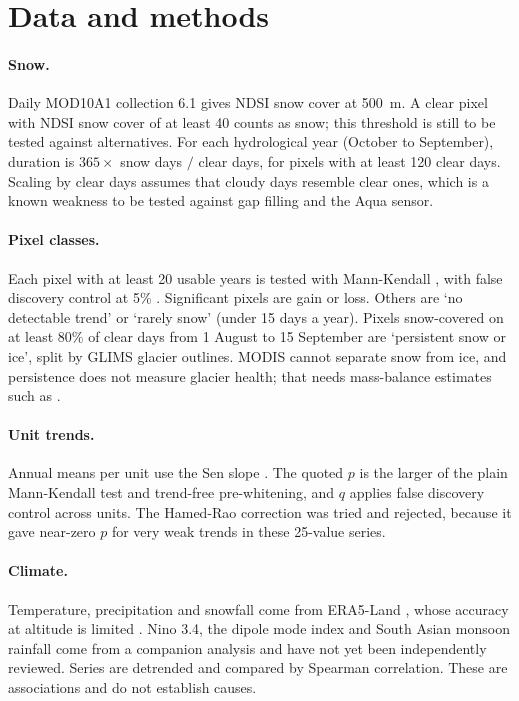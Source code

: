 \documentclass[11pt,a4paper]{article}
\begin{document}
\section{Data and methods}
\paragraph{Snow.} Daily MOD10A1 collection 6.1 \citep{Hall_2002,Riggs_2017} gives NDSI snow cover at 500~m. A clear pixel with NDSI snow cover of at least 40 counts as snow; this threshold is still to be tested against alternatives. For each hydrological year (October to September), duration is $365 \times$ snow days $/$ clear days, for pixels with at least 120 clear days. Scaling by clear days assumes that cloudy days resemble clear ones, which is a known weakness to be tested against gap filling and the Aqua sensor.

\paragraph{Pixel classes.} Each pixel with at least 20 usable years is tested with Mann-Kendall \citep{Yue_2002}, with false discovery control at 5\% \citep{Benjamini_1995,Wilks_2016}. Significant pixels are gain or loss. Others are `no detectable trend' or `rarely snow' (under 15 days a year). Pixels snow-covered on at least 80\% of clear days from 1 August to 15 September are `persistent snow or ice', split by GLIMS glacier outlines. MODIS cannot separate snow from ice, and persistence does not measure glacier health; that needs mass-balance estimates such as \citet{Hugonnet_2021}.

\paragraph{Unit trends.} Annual means per unit use the Sen slope \citep{Sen_1968}. The quoted $p$ is the larger of the plain Mann-Kendall test and trend-free pre-whitening, and $q$ applies false discovery control across units. The Hamed-Rao correction \citep{Hamed_1998} was tried and rejected, because it gave near-zero $p$ for very weak trends in these 25-value series.

\paragraph{Climate.} Temperature, precipitation and snowfall come from ERA5-Land \citep{MunozSabater_2021}, whose accuracy at altitude is limited \citep{Palazzi_2013}. Nino 3.4, the dipole mode index \citep{Saji_1999} and South Asian monsoon rainfall come from a companion analysis and have not yet been independently reviewed. Series are detrended and compared by Spearman correlation. These are associations and do not establish causes.
\end{document}
